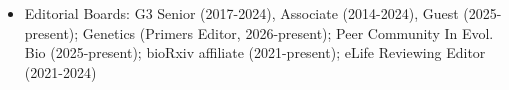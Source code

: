 \documentclass[letterpaper,10pt]{article}
\newcommand{\ignore}[1]{}
\begin{document}
\begin{itemize}
\item Editorial Boards: 
G3 Senior (2017-2024), Associate (2014-2024), Guest (2025-present); \newline %
Genetics (Primers Editor, 2026-present);
Peer Community In Evol. Bio (2025-present); \newline bioRxiv affiliate (2021-present); eLife Reviewing Editor (2021-2024) %

\end{itemize}
\end{document}

